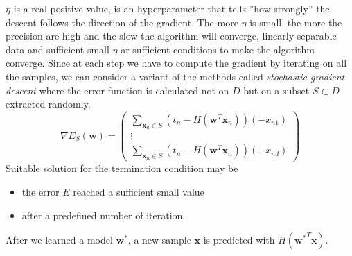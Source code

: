\documentclass[10pt, letterpaper]{report}
\begin{document}
$\eta$ is a real positive value, is an hyperparameter that tells ''how strongly'' the descent follows the direction of the gradient. The more $\eta$ is small, the more the precision are high and the slow the algorithm will converge, linearly separable data and sufficient small $\eta$ ar sufficient conditions to make the algorithm converge. Since at each step we have to compute the gradient by iterating on all the samples, we can consider a variant of the methods called \textit{stochastic gradient descent} where the error function is calculated not on $D$ but on a subset $S\subset D$ extracted randomly.\begin{equation}
    \nabla E_S(\mathbf w)=\begin{pmatrix}
        \sum_{\mathbf x_n\in S}(t_n-H(\mathbf w^T\mathbf x_n))(- x_{n1})\\ 
        \vdots \\ 
        \sum_{\mathbf x_n\in S}(t_n-H(\mathbf w^T\mathbf x_n))(- x_{nd})
    \end{pmatrix}
\end{equation}
Suitable solution for the termination condition may be\begin{itemize}
    \item the error $E$ reached a sufficient small value 
    \item after a predefined number of iteration.
\end{itemize}
After we learned a model $\mathbf w^*$, a new sample $\mathbf x$ is predicted with $H({\mathbf  w^*}^T\mathbf x)$.
\end{document}
